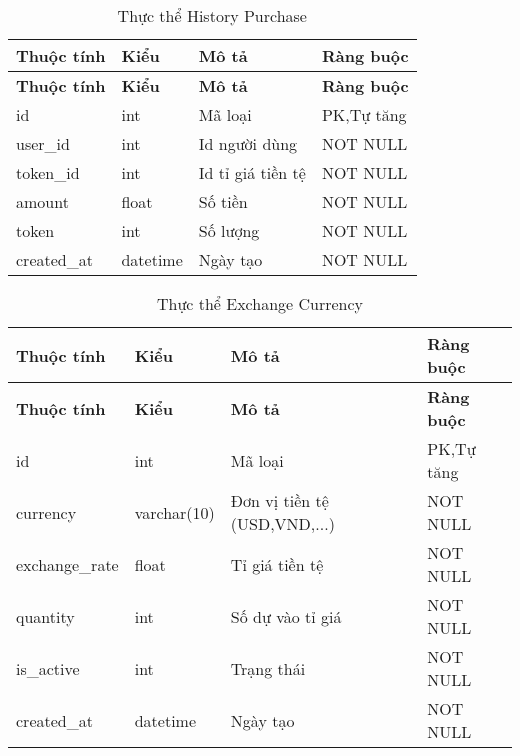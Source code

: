\begin{center}
\begin{longtabu} to 
\caption{Thực thể History Purchase} \\
   \hline \textbf{Thuộc tính}  & \textbf{Kiểu} & \textbf{Mô tả} & \textbf{Ràng buộc} \\ \hline
   \endfirsthead
   \hline \textbf{Thuộc tính}  & \textbf{Kiểu} & \textbf{Mô tả} & \textbf{Ràng buộc} \\ \hline
   \endhead
      id & int  & Mã loại & PK,Tự tăng
      \\ \hline
      user\_id & int & Id người dùng & NOT NULL 
      \\ \hline
      token\_id & int & Id tỉ giá tiền tệ  & NOT NULL 
      \\ \hline
      amount & float & Số tiền & NOT NULL
       \\ \hline
      token & int & Số lượng  & NOT NULL
      \\ \hline
      created\_at & datetime & Ngày tạo & NOT NULL
      \\ \hline
\end{longtabu}
\end{center}

\begin{center}
\begin{longtabu} to 
\caption{Thực thể Exchange Currency} \\
   \hline \textbf{Thuộc tính}  & \textbf{Kiểu} & \textbf{Mô tả} & \textbf{Ràng buộc} \\ \hline
   \endfirsthead
   \hline \textbf{Thuộc tính}  & \textbf{Kiểu} & \textbf{Mô tả} & \textbf{Ràng buộc} \\ \hline
   \endhead
      id & int  & Mã loại & PK,Tự tăng
      \\ \hline
      currency & varchar(10) & Đơn vị tiền tệ (USD,VND,...) & NOT NULL 
      \\ \hline
      exchange\_rate & float & Tỉ giá tiền tệ  & NOT NULL 
      \\ \hline
      quantity & int & Số  dự vào tỉ giá & NOT NULL
       \\ \hline
      is\_active & int & Trạng thái & NOT NULL
      \\ \hline
      created\_at & datetime & Ngày tạo & NOT NULL
      \\ \hline
\end{longtabu}
\end{center}

